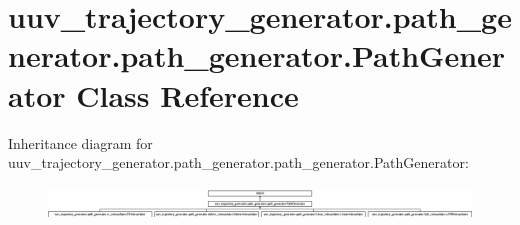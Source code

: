 \hypertarget{classuuv__trajectory__generator_1_1path__generator_1_1path__generator_1_1PathGenerator}{}\section{uuv\+\_\+trajectory\+\_\+generator.\+path\+\_\+generator.\+path\+\_\+generator.\+Path\+Generator Class Reference}
\label{classuuv__trajectory__generator_1_1path__generator_1_1path__generator_1_1PathGenerator}
Inheritance diagram for uuv\+\_\+trajectory\+\_\+generator.\+path\+\_\+generator.\+path\+\_\+generator.\+Path\+Generator\+:\begin{figure}[H]
\begin{center}
\leavevmode
\includegraphics[height=0.887949cm]{classuuv__trajectory__generator_1_1path__generator_1_1path__generator_1_1PathGenerator}
\end{center}
\end{figure}
